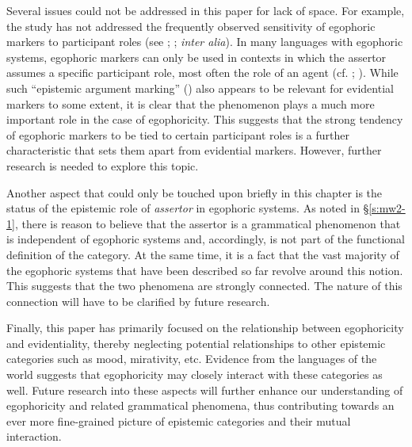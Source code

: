 \documentclass[output=paper]{langsci/langscibook}
\begin{document}
Several issues could not be addressed in this paper for lack of space. For example, the study has not addressed the frequently observed sensitivity of egophoric markers to participant roles (see \citealt{Bickel2008}; \citealt{Post2013}; \emph{inter alia}). In many languages with egophoric systems, egophoric markers can only be used in contexts in which the assertor assumes a specific participant role, most often the role of an agent (cf. \citealt{WidmerZemp2017}; \citealt{WidmerZuniga2017}). While such “epistemic argument marking” (\citealt{Bickel2008}) also appears to be relevant for evidential markers to some extent, it is clear that the phenomenon plays a much more important role in the case of egophoricity. This suggests that the strong tendency of egophoric markers to be tied to certain participant roles is a further characteristic that sets them apart from evidential markers. However, further research is needed to explore this topic.

Another aspect that could only be touched upon briefly in this chapter is the status of the epistemic role of \emph{assertor} in egophoric systems. As noted in §\ref{s:mw2-1}, there is reason to believe that the assertor is a grammatical phenomenon that is independent of egophoric systems and, accordingly, is not part of the functional definition of the category. At the same time, it is a fact that the vast majority of the egophoric systems that have been described so far revolve around this notion. This suggests that the two phenomena are strongly connected. The nature of this connection will have to be clarified by future research.

Finally, this paper has primarily focused on the relationship between egophoricity and evidentiality, thereby neglecting potential relationships to other epistemic categories such as mood, mirativity, etc. Evidence from the languages of the world suggests that egophoricity may closely interact with these categories as well. Future research into these aspects will further enhance our understanding of egophoricity and related grammatical phenomena, thus contributing towards an ever more fine-grained picture of epistemic categories and their mutual interaction.
 
 
\end{document}
